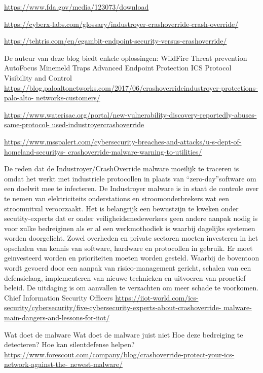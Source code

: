 		\url{https://www.fda.gov/media/123073/download}
		
		\url{https://cyberx-labs.com/glossary/industroyer-crashoverride-crash-override/}
		
		\url{https://tehtris.com/en/egambit-endpoint-security-versus-crashoverride/}
		
		De auteur van deze blog biedt enkele oplossingen:
		WildFire
		Threat prevention
		AutoFocus
		Minemeld
		Traps Advanced Endpoint Protection
		ICS Protocol Visibility and Control
		\url{https://blog.paloaltonetworks.com/2017/06/crashoverrideindustroyer-protections-palo-alto-
			networks-customers/}
		
		\url{https://www.waterisac.org/portal/new-vulnerability-discovery-reportedly-abuses-same-protocol-
			used-industroyercrashoverride}
		
		\url{https://www.msspalert.com/cybersecurity-breaches-and-attacks/u-s-dept-of-homeland-securitys-
			crashoverride-malware-warning-to-utilities/}
		
		De reden dat de Industroyer/CrashOverride malware moeilijk te traceren is omdat het werkt met
		industriele protocollen in plaats van “zero-day”software om een doelwit mee te infecteren. De
		Industroyer malware is in staat de controle over te nemen van elektriciteits onderstations en
		stroomonderbrekers wat een stroomuitval veroorzaakt.
		Het is belangrijk een bewustzijn te kweken onder secutity-experts dat er onder
		veiligheidsmedewerkers geen andere aanpak nodig is voor zulke bedreiginen als er al een
		werkmothodiek is waarbij dagelijks systemen worden doorgelicht.
		Zowel overheden en private sectoren moeten investeren in het opschalen van kennis van software,
		hardware en protocollen in gebruik. Er moet geinvesteerd worden en prioriteiten moeten worden
		gesteld. Waarbij de boventoon wordt gevoerd door een aanpak van risico-management gericht,
		schalen van een defensielaag, implementeren van nieuwe technieken en uitvoeren van proactief
		beleid. De uitdaging is om aanvallen te verzachten om meer schade te voorkomen.
		Chief Information Security Officers
		\url{https://iiot-world.com/ics-security/cybersecurity/five-cybersecurity-experts-about-crashoverride-
			malware-main-dangers-and-lessons-for-iiot/}
		
		Wat doet de malware
		Wat doet de malware juist niet
		Hoe deze bedreiging te detecteren?
		Hoe kan silentdefense helpen?
		\url{https://www.forescout.com/company/blog/crashoverride-protect-your-ics-network-against-the-
			newest-malware/}
		
